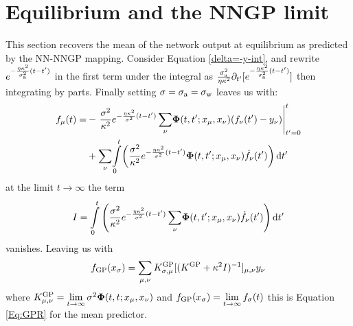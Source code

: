 \section{Equilibrium and the NNGP limit}\label{Result 3}
This section recovers the mean of the network output at equilibrium as predicted by the NN-NNGP mapping.
Consider Equation \ref{delta=-y-int}, and rewrite  $e^{-\frac{\eta\kappa^2}{\sigma_{\rm a}^2}(t-t')}$ in the first term under the integral as $\frac{\sigma_{\rm a}^2}{\eta\kappa^2}\partial_{t'}[ e^{-\frac{\eta\kappa^2}{\sigma_{\rm a}^2}(t-t')}]$ then integrating by parts. Finally setting $\sigma=\sigma_{\rm a}=\sigma_{\rm w}$ leaves us with:
\begin{align}
  f_{\mu}(t)=&-\left.\frac{\sigma^2}{\kappa^2} e^{-\frac{\eta\kappa^2}{\sigma^2}(t-t')}\sum\limits_{\nu}\! \bm{\Phi}(t,t';x_\mu,x_\nu) (f_{\nu}(t')-y_{\nu}) \right|_{t'=0}^{t}\notag\\&+\sum\limits_{\nu}\!\int\limits_0^t\!  \left(\frac{\sigma^2}{\kappa^2}  e^{-\frac{\eta\kappa^2}{\sigma^2}(t-t')} \bm{\Phi}(t,t';x_\mu,x_\nu)\dot{f}_{\nu}(t') \right) \text{d} t' \label{the discrepancy equation}
\end{align}
at the limit $t\rightarrow\infty$ the term
\begin{equation} \label{eq:integral term}
    I=\int\limits_0^t  \left( \frac{\sigma^2}{\kappa^2}  e^{-\frac{\eta\kappa^2}{\sigma^2}(t-t')} \sum\limits_{\nu}\!\bm{\Phi}(t,t';x_\mu,x_\nu)\dot{f}_{\nu}(t') \right) \text{d} t'
\end{equation}
vanishes.
Leaving us with
\begin{equation}
    f_{\text{GP}}(x_\sigma)=\sum\limits_{\mu,\nu}K^{\text{GP}}_{\sigma,\mu}
    [(K^{\text{GP}}+\kappa^2 I)^{-1}]_{\mu,\nu}
    y_\nu
\end{equation}
where $K^{\text{GP}}_{\mu,\nu}=\lim\limits_{t\rightarrow\infty}\sigma^2\bm{\Phi}(t,t;x_\mu,x_\nu)$ and $ f_{\text{GP}}(x_\sigma)=\lim\limits_{t\rightarrow\infty} f_\sigma(t)$ this is Equation \ref{Eq:GPR} for the mean predictor.
